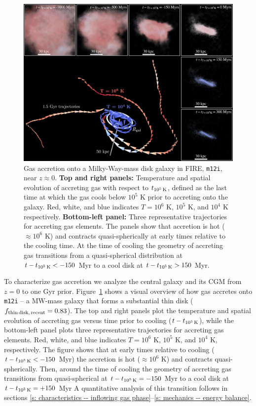 \documentclass[fleqn,usenatbib]{mnras}
\newcommand{\tcon}{t_{10^5\,{\rm K}}}
\begin{document}
\begin{figure}
    \centering
    \includegraphics[width=\textwidth]{figures/illustrative_tracks/illustrative_tracks.png}
    \caption{
Gas accretion onto a Milky-Way-mass disk galaxy in FIRE, \texttt{m12i}, near $z\approx0$.
\textbf{Top and right panels:}
Temperature and spatial evolution of accreting gas with respect to $\tcon$, defined as the last time at which the gas cools below $10^5$ K prior to accreting onto the galaxy.
Red, white, and blue indicates $T=10^6$ K, $10^5$ K, and $10^4$ K respectively. 
\textbf{Bottom-left panel:}
Three representative trajectories for accreting gas elements.
The panels show that accretion is hot ($\approx 10^6$ K) and contracts quasi-spherically at early times relative to the cooling time.
At the time of cooling the geometry of accreting gas transitions from a quasi-spherical distribution at $t-\tcon < -150$ Myr to a cool disk at $t-\tcon > 150$ Myr.
    }
    \label{f: overview}
\end{figure}

To characterize gas accretion we analyze the central galaxy and its CGM from $z=0$ to one Gyr prior.
Figure~\ref{f: overview} shows a visual overview of how gas accretes onto \texttt{m12i} -- a MW-mass galaxy that forms a substantial thin disk ($f_{\rm thin\,disk,\,recent} = 0.83$). 
The top and right panels plot the temperature and spatial evolution of accreting gas versus time prior to cooling ($t-\tcon$), while the bottom-left panel plots three representative trajectories for accreting gas elements. 
Red, white, and blue indicates $T=10^6$ K, $10^5$ K, and $10^4$ K, respectively.
The figure shows that at early times relative to cooling ($t-\tcon<-150$ Myr) the accretion is hot ($\approx10^6$ K) and contracts quasi-spherically.
Then, around the time of cooling the geometry of accreting gas transitions from quasi-spherical at $t - \tcon=-150$ Myr to a cool disk at $t - \tcon=+ 150$ Myr
A quantitative analysis of this transition follows in sections \ref{s: characteristics -- inflowing gas phase}--\ref{s: mechanics -- energy balance}.
\end{document}
